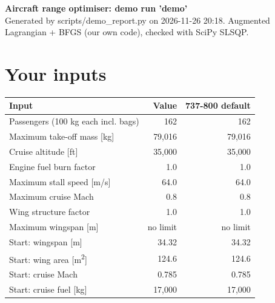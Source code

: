 \documentclass[10pt,a4paper]{article}
\begin{document}
\begin{center}{\Large\bfseries Aircraft range optimiser: demo run 'demo'}\\[4pt]
{\small Generated by scripts/demo\_report.py on 2026-11-26 20:18. Augmented Lagrangian + BFGS (our own code), checked with SciPy SLSQP.}\end{center}
\section{Your inputs}
\begin{table}[H]\centering\small
\begin{tabular}{lrr}
\toprule
\textbf{Input} & \textbf{Value} & \textbf{737-800 default} \\
\midrule
Passengers (100 kg each incl. bags) & 162 & 162 \\
Maximum take-off mass [kg] & 79,016 & 79,016 \\
Cruise altitude [ft] & 35,000 & 35,000 \\
Engine fuel burn factor & 1.0 & 1.0 \\
Maximum stall speed [m/s] & 64.0 & 64.0 \\
Maximum cruise Mach & 0.8 & 0.8 \\
Wing structure factor & 1.0 & 1.0 \\
Maximum wingspan [m] & no limit & no limit \\
Start: wingspan [m] & 34.32 & 34.32 \\
Start: wing area [m\textsuperscript{2}] & 124.6 & 124.6 \\
Start: cruise Mach & 0.785 & 0.785 \\
Start: cruise fuel [kg] & 17,000 & 17,000 \\
\bottomrule
\end{tabular}
\end{table}
\end{document}
